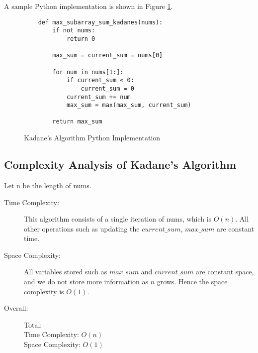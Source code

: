 A sample Python implementation is shown in Figure \ref{fig:kadanes}.

\begin{figure}[H]
    \centering
    \begin{lstlisting}
    def max_subarray_sum_kadanes(nums):
        if not nums:
            return 0
    
        max_sum = current_sum = nums[0]
    
        for num in nums[1:]:
            if current_sum < 0:
                current_sum = 0
            current_sum += num
            max_sum = max(max_sum, current_sum)
    
        return max_sum
    \end{lstlisting}
    \caption{Kadane's Algorithm Python Implementation}
    \label{fig:kadanes}
\end{figure}



\subsection{Complexity Analysis of Kadane's Algorithm}
Let n be the length of nums.
\begin{description}
    \item[Time Complexity:]
        This algorithm consists of a single iteration of nums, which is $O(n)$.
        All other operations such as updating the $current\_sum$, $max\_sum$ are constant time.
        
    \item[Space Complexity:] 
        All variables stored such as $max\_sum$ and $current\_sum$ are constant space,
        and we do not store more information as $n$ grows. Hence the space complexity is $O(1)$.

        
    \item[Overall:] Total:\\
        Time Complexity: $O(n)$\\
        Space Complexity: $O(1)$
    
\end{description}
\newpage